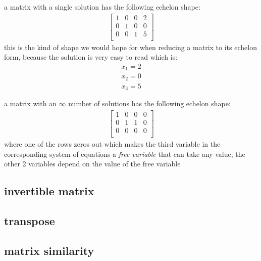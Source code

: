 \documentclass[a4paper,12pt]{article}
\begin{document}
\begin{characteristic}
a matrix with a single solution has the following echelon shape:\\
\begin{gather*}
  \left[
    \begin{array}{ccc|c}
      1 & 0 & 0 & 2 \\
      0 & 1 & 0 & 0 \\
      0 & 0 & 1 & 5 \\
    \end{array}
  \right]
\end{gather*}
this is the kind of shape we would hope for when reducing a matrix to its echelon form, because the solution is very easy to read which is:\\
\begin{align*}
  x_1 = 2\\
  x_2 = 0\\
  x_3 = 5
\end{align*}
\end{characteristic}

\begin{characteristic}
a matrix with an \(\infty\) number of solutions has the following echelon shape:\\
\begin{gather*}
  \left[
    \begin{array}{ccc|c}
      1 & 0 & 0 & 0 \\
      0 & 1 & 1 & 0 \\
      0 & 0 & 0 & 0 \\
    \end{array}
  \right]
\end{gather*}
where one of the rows zeros out which makes the third variable in the corresponding system of equations a \emph{free variable} that can take any value, the other 2 variables depend on the value of the free variable\\
\end{characteristic}
\subsection{invertible matrix}
\label{sec:orgb6a6a45}
\subsection{transpose}
\label{sec:org668c066}
\subsection{matrix similarity}
\label{sec:org5ddd44c}
\end{document}

